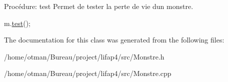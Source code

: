 Procédure\+: test Permet de tester la perte de vie d\textquotesingle{}un monstre. 


\begin{DoxyCode}
m.\hyperlink{classMonstre_a4f22d17531f5ca164355740d035485ee}{test}();
\end{DoxyCode}
 

The documentation for this class was generated from the following files\+:\begin{DoxyCompactItemize}
\item 
/home/otman/\+Bureau/project/lifap4/src/Monstre.\+h\item 
/home/otman/\+Bureau/project/lifap4/src/Monstre.\+cpp\end{DoxyCompactItemize}
